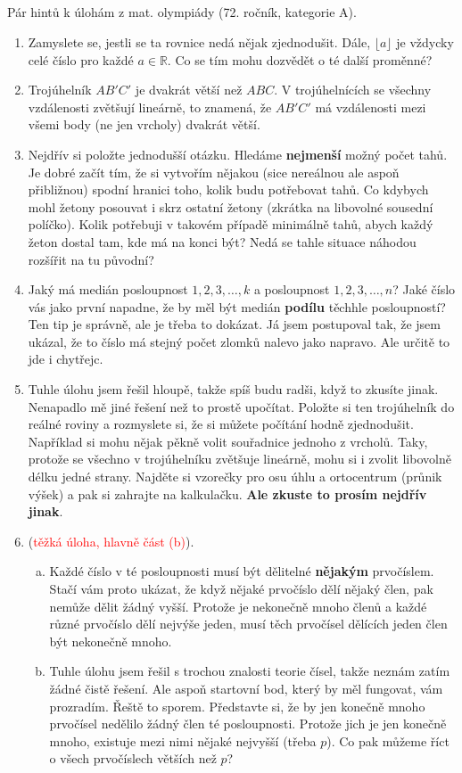 \documentclass[a4paper,11pt]{article}
\title{\Huge\textsf{}\\
 \Large\textsf{}
 \author{}
 \date{}
}
\newcommand{\R}{\mathbb{R}}
\begin{document}
Pár hintů k úlohám z mat. olympiády (72. ročník, kategorie A).

\begin{enumerate}
 \item Zamyslete se, jestli se ta rovnice nedá nějak zjednodušit. Dále,
  $\lfloor a \rfloor$ je vždycky celé číslo pro každé $a \in \R$. Co se tím
  mohu dozvědět o té další proměnné?
 \item Trojúhelník $AB'C'$ je dvakrát větší než $ABC$. V trojúhelnících se
  všechny vzdálenosti zvětšují lineárně, to znamená, že $AB'C'$ má vzdálenosti
  mezi všemi body (ne jen vrcholy) dvakrát větší.
 \item Nejdřív si položte jednodušší otázku. Hledáme \textbf{nejmenší} možný
  počet tahů. Je dobré začít tím, že si vytvořím nějakou (sice nereálnou ale
  aspoň přibližnou) spodní hranici toho, kolik budu potřebovat tahů. Co kdybych
  mohl žetony posouvat i skrz ostatní žetony (zkrátka na libovolné sousední 
  políčko). Kolik potřebuji v takovém případě minimálně tahů, abych každý žeton
  dostal tam, kde má na konci být? Nedá se tahle situace náhodou rozšířit na tu
  původní?
 \item Jaký má medián posloupnost $1,2,3,\ldots,k$ a posloupnost
  $1,2,3,\ldots,n$? Jaké číslo vás jako první napadne, že by měl být medián
  \textbf{podílu} těchhle posloupností? Ten tip je správně, ale je třeba to
  dokázat. Já jsem postupoval tak, že jsem ukázal, že to číslo má stejný počet
  zlomků nalevo jako napravo. Ale určitě to jde i chytřejc.
 \item Tuhle úlohu jsem řešil hloupě, takže spíš budu radši, když to zkusíte
  jinak. Nenapadlo mě jiné řešení než to prostě upočítat. Položte si ten
  trojúhelník do reálné roviny a rozmyslete si, že si můžete počítání hodně
  zjednodušit. Například si mohu nějak pěkně volit souřadnice jednoho z
  vrcholů. Taky, protože se všechno v trojúhelníku zvětšuje lineárně, mohu si i
  zvolit libovolně délku jedné strany. Najděte si vzorečky pro osu úhlu a
  ortocentrum (průnik výšek) a pak si zahrajte na kalkulačku. \textbf{Ale
  zkuste to prosím nejdřív jinak}.
 \item (\textcolor{red}{těžká úloha, hlavně část (b)}).
  \begin{enumerate}[(a)]
   \item Každé číslo v té posloupnosti musí být dělitelné \textbf{nějakým}
    prvočíslem.  Stačí vám proto ukázat, že když nějaké prvočíslo dělí nějaký
    člen, pak nemůže dělit žádný vyšší. Protože je nekonečně mnoho členů a
    každé různé prvočíslo dělí nejvýše jeden, musí těch prvočísel dělících
    jeden člen být nekonečně mnoho.
   \item Tuhle úlohu jsem řešil s trochou znalosti teorie čísel, takže neznám
    zatím žádné čistě  řešení. Ale aspoň startovní bod, který
    by měl fungovat, vám prozradím. Řeště to sporem. Představte si, že by jen
    konečně mnoho prvočísel nedělilo žádný člen té posloupnosti. Protože jich
    je jen konečně mnoho, existuje mezi nimi nějaké nejvyšší (třeba $p$). Co
    pak můžeme říct o všech prvočíslech větších než $p$?
  \end{enumerate}
\end{enumerate}
\end{document}

